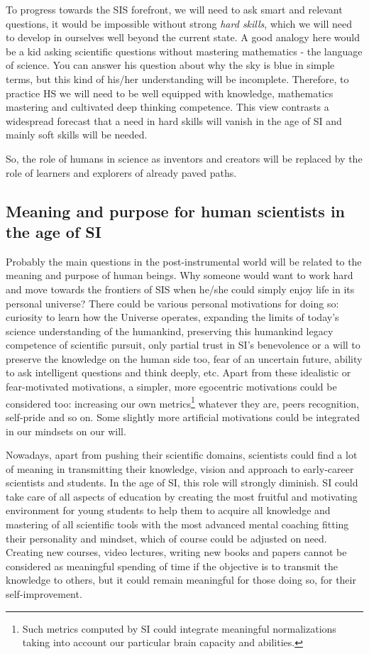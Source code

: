 \documentclass[a4paper,11pt]{article}
\begin{document}
        To progress towards the SIS forefront, we will need to ask smart and relevant questions, it would be impossible without strong \emph{hard skills}, which we will need to develop in ourselves well beyond the current state. A good analogy here would be a kid asking scientific questions without mastering mathematics - the language of science. You can answer his question about why the sky is blue in simple terms, but this kind of his/her understanding will be incomplete. Therefore, to practice HS we will need to be well equipped with knowledge, mathematics mastering and cultivated deep thinking competence. This view contrasts a widespread forecast that a need in hard skills will vanish in the age of SI and mainly soft skills will be needed.

        So, the role of humans in science as inventors and creators will be replaced by the role of learners and explorers of already paved paths. 

    \subsection{Meaning and purpose for human scientists in the age of SI}

    Probably the main questions in the post-instrumental world will be related to the meaning and purpose of human beings. Why someone would want to work hard and move towards the frontiers of SIS when he/she could simply enjoy life in its personal universe? There could be various personal motivations for doing so: curiosity to learn how the Universe operates, expanding the limits of today's science understanding of the humankind, preserving this  humankind legacy competence of scientific pursuit, only partial trust in SI's benevolence or a will to preserve the knowledge on the human side too, fear of an uncertain future, ability to ask intelligent questions and think deeply, etc. Apart from these idealistic or fear-motivated motivations, a simpler, more egocentric motivations could be considered too: increasing our own metrics\footnote{Such metrics computed by SI could integrate meaningful normalizations taking into account our particular brain capacity and abilities.} whatever they are, peers recognition, self-pride and so on.
    Some slightly more artificial motivations could be integrated in our mindsets on our will.

    Nowadays, apart from pushing their scientific domains, scientists could find a lot of meaning in transmitting their knowledge, vision and approach to early-career scientists and students. In the age of SI, this role will strongly diminish. SI could take care of all aspects of education by creating the most fruitful and motivating environment for young students to help them to acquire all knowledge and mastering of all scientific tools with the most advanced mental coaching fitting their personality and mindset, which of course could be adjusted on need. Creating new courses, video lectures, writing new books and papers cannot be considered as meaningful spending of time if the objective is to transmit the knowledge to others, but it could remain meaningful for those doing so, for their self-improvement.
\end{document}
